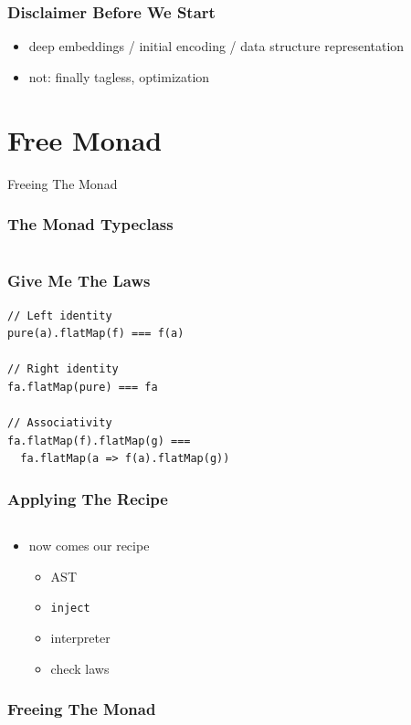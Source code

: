 \documentclass{beamer}
\newcommand{\recipe}{%
  \begin{itemize}
  \item AST
  \item \texttt{inject}
  \item interpreter
  \item check laws
  \end{itemize}
}
\begin{document}
\begin{frame}
  \frametitle{Disclaimer Before We Start}
  \begin{itemize}
  \item deep embeddings / initial encoding / data structure representation
  \item not: finally tagless, optimization
  \end{itemize}
\end{frame}

\section{Free Monad}\label{sec:free-monad}
\begin{frame}
  \begin{center}
    \Huge
    Freeing The Monad
  \end{center}
\end{frame}

\begin{frame}[fragile]
  \frametitle{The Monad Typeclass}
  \begin{center}
    \inputminted{scala}{snippets/monad-typeclass.scala}
  \end{center}
\end{frame}

\begin{frame}[fragile]
  \frametitle{Give Me The Laws}
    \begin{center}
\begin{verbatim}
// Left identity
pure(a).flatMap(f) === f(a)

// Right identity
fa.flatMap(pure) === fa

// Associativity
fa.flatMap(f).flatMap(g) ===
  fa.flatMap(a => f(a).flatMap(g))
\end{verbatim}
    \end{center}
\end{frame}

\begin{frame}[fragile]
  \frametitle{Applying The Recipe}
  \begin{center}
    \inputminted{scala}{snippets/monad-typeclass.scala}
  \end{center}
  \begin{itemize}
  \item now comes our recipe
    \recipe{}
  \end{itemize}
\end{frame}

\begin{frame}[fragile]
  \frametitle{Freeing The Monad}
  \begin{center}
    \inputminted{scala}{snippets/free-monad.scala}
  \end{center}
\end{frame}
\end{document}
